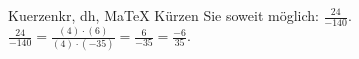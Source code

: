 \begin{MAufgabe}{Kuerzen}{kr, dh, MaTeX}
K\"urzen Sie soweit m\"oglich: $\frac{24}{-140}$.\\ 
\ifLsg\MLoesung
\quad $\frac{24}{-140}=\frac{(4)\cdot(6)}{(4)\cdot(-35)}=\frac{6}{-35}=\frac{-6}{35}$.\else\relax\fi
 \end{MAufgabe}